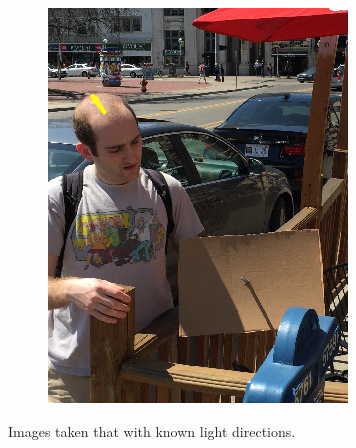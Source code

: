 \documentclass[10pt,twocolumn,letterpaper]{article}
\begin{document}
{\begin{figure}[]
\begin{subfigure}{.5\linewidth}
	  \caption{}
	  \label{fig:sfig5}
	\end{subfigure}
	\begin{subfigure}{.5\linewidth}
	  \centering
		\includegraphics[width=0.5\linewidth]{nathan_2.png}
	  \caption{}
	  \label{fig:sfig6}
	\end{subfigure}
	\caption{Images taken that with known light directions.}
	\label{fig:images}
	\end{figure}
	\clearpage
}
\end{document}
